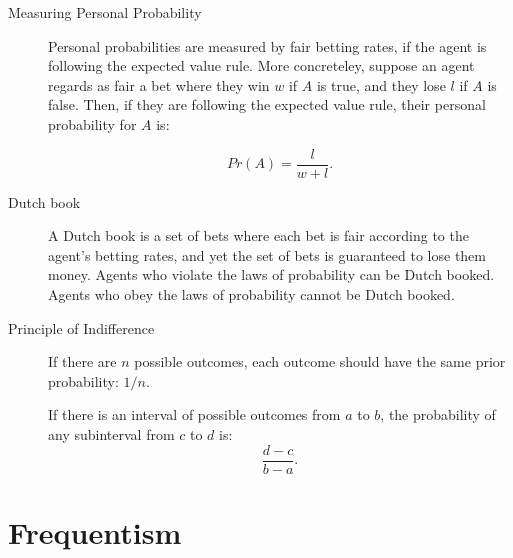 \documentclass[justified]{tufte-book}
\newcommand{\p}{Pr}
\theoremstyle{definition}
\theoremstyle{definition}
\theoremstyle{definition}
\theoremstyle{remark}
\begin{document}
\begin{description}
\item[Measuring Personal Probability]
Personal probabilities are measured by fair betting rates, if the agent is following the expected value rule. More concreteley, suppose an agent regards as fair a bet where they win \(w\) if \(A\) is true, and they lose \(l\) if \(A\) is false. Then, if they are following the expected value rule, their personal probability for \(A\) is:

\[ \p(A) = \frac{l}{w + l}. \]
\item[Dutch book]
A Dutch book is a set of bets where each bet is fair according to the agent's betting rates, and yet the set of bets is guaranteed to lose them money. Agents who violate the laws of probability can be Dutch booked. Agents who obey the laws of probability cannot be Dutch booked.
\item[Principle of Indifference]
If there are \(n\) possible outcomes, each outcome should have the same prior probability: \(1/n\).

If there is an interval of possible outcomes from \(a\) to \(b\), the probability of any subinterval from \(c\) to \(d\) is: \[\frac{d-c}{b-a}.\]
\end{description}

\hypertarget{frequentism-1}{%
\section*{Frequentism}\label{frequentism-1}}
\end{document}
